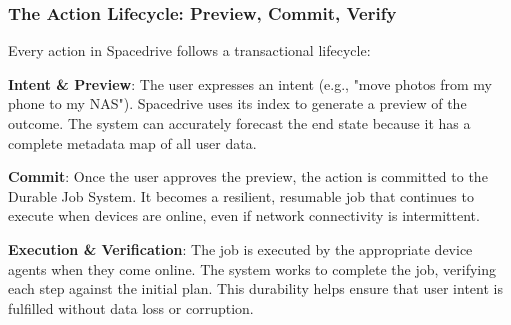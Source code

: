 \documentclass[sigconf]{acmart}
\begin{document}
\subsubsection{The Action Lifecycle: Preview, Commit, Verify}

Every action in Spacedrive follows a transactional lifecycle:

\textbf{Intent \& Preview}: The user expresses an intent (e.g., "move photos from my phone to my NAS"). Spacedrive uses its index to generate a preview of the outcome. The system can accurately forecast the end state because it has a complete metadata map of all user data.

\textbf{Commit}: Once the user approves the preview, the action is committed to the Durable Job System. It becomes a resilient, resumable job that continues to execute when devices are online, even if network connectivity is intermittent.

\textbf{Execution \& Verification}: The job is executed by the appropriate device agents when they come online. The system works to complete the job, verifying each step against the initial plan. This durability helps ensure that user intent is fulfilled without data loss or corruption.
\end{document}
